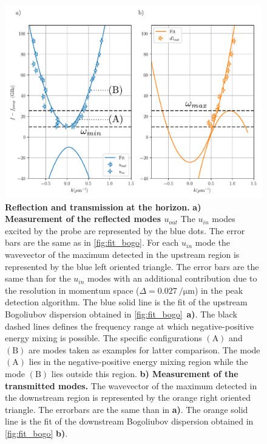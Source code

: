 \begin{figure}
    \centering
    \includegraphics[width=1\textwidth]{chap_stimulated_hawking/fig/fit_bogo_RT.pdf}
    \caption{
    \textbf{Reflection and transmission at the horizon.}
    \textbf{a) Measurement of the reflected modes $u_{out}$} The $u_{in}$ modes excited by the probe are represented by the blue dots. The error bars are the same as in \autoref{fig:fit_bogo}. For each $u_{in}$ mode
    the wavevector of the maximum detected in the upstream region is represented by the blue left oriented triangle. The error bars are the same than for the $u_{in}$ modes with an additional contribution due to the resolution in momentum space ($\Delta=\SI{0.027}{\per \micro \meter}$) in the peak detection algorithm.
    The blue solid line is the fit of the upstream Bogoliubov dispersion obtained in \autoref{fig:fit_bogo}~\textbf{a)}.
    The black dashed lines defines the frequency range at which negative-positive energy mixing is possible.
    The specific configurations $\mathrm{(A)}$ and $\mathrm{(B)}$ are modes taken as examples for latter comparison. The mode $\mathrm{(A)}$ lies in the negative-positive energy mixing region while the mode $\mathrm{(B)}$ lies outside this region.
    \textbf{b) Measurement of the transmitted modes.} The wavevector of the maximum detected in the downstream region is represented by the orange right oriented triangle. The errorbars are the same than in \textbf{a)}. 
    The orange solid line is the fit of the downstream Bogoliubov dispersion obtained in \autoref{fig:fit_bogo} \textbf{b)}. }
    \label{fig:fit_bogo_RT}
\end{figure}

